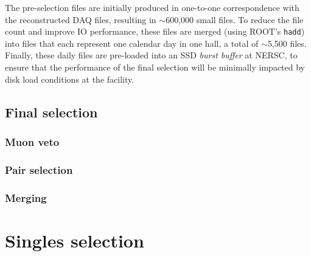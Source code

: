 \documentclass[../thesis.tex]{subfiles}
\begin{document}
The pre-selection files are initially produced in one-to-one correspondence with the reconstructed DAQ files, resulting in $\sim$600,000 small files. To reduce the file count and improve IO performance, these files are merged (using ROOT's \texttt{hadd}) into files that each represent one calendar day in one hall, a total of $\sim$5,500 files. Finally, these daily files are pre-loaded into an SSD \emph{burst buffer} at NERSC, to ensure that the performance of the final selection will be minimally impacted by disk load conditions at the facility.

\subsection{Final selection}
\label{sec:selFinalSel}

\subsubsection{Muon veto}
\label{sec:selMuonVeto}

\subsubsection{Pair selection}
\label{sec:pairSel}

\subsubsection{Merging}
\label{sec:selMergingTwo}

\section{Singles selection}
\label{sec:selSingles}
\end{document}
